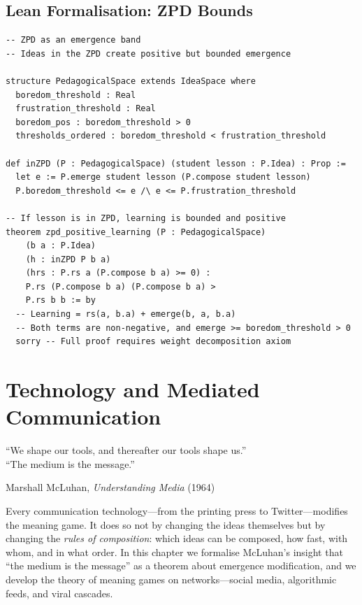 \section{Lean Formalisation: ZPD Bounds}
\label{sec:pedagogy-lean}

\begin{lstlisting}[caption={Zone of proximal development in Lean 4},label={lst:zpd}]
-- ZPD as an emergence band
-- Ideas in the ZPD create positive but bounded emergence

structure PedagogicalSpace extends IdeaSpace where
  boredom_threshold : Real
  frustration_threshold : Real
  boredom_pos : boredom_threshold > 0
  thresholds_ordered : boredom_threshold < frustration_threshold

def inZPD (P : PedagogicalSpace) (student lesson : P.Idea) : Prop :=
  let e := P.emerge student lesson (P.compose student lesson)
  P.boredom_threshold <= e /\ e <= P.frustration_threshold

-- If lesson is in ZPD, learning is bounded and positive
theorem zpd_positive_learning (P : PedagogicalSpace)
    (b a : P.Idea)
    (h : inZPD P b a)
    (hrs : P.rs a (P.compose b a) >= 0) :
    P.rs (P.compose b a) (P.compose b a) >
    P.rs b b := by
  -- Learning = rs(a, b.a) + emerge(b, a, b.a)
  -- Both terms are non-negative, and emerge >= boredom_threshold > 0
  sorry -- Full proof requires weight decomposition axiom
\end{lstlisting}



\chapter{Technology and Mediated Communication}
\label{ch:technology}

\epigraph{``We shape our tools, and thereafter our tools shape us.''\\ \medskip
``The medium is the message.''}{Marshall McLuhan, \textit{Understanding Media} (1964)}

Every communication technology---from the printing press to
Twitter---modifies the meaning game.  It does so not by changing
the ideas themselves but by changing the \emph{rules of composition}:
which ideas can be composed, how fast, with whom, and in what order.
In this chapter we formalise McLuhan's insight that ``the medium is
the message'' as a theorem about emergence modification, and we
develop the theory of meaning games on networks---social media,
algorithmic feeds, and viral cascades.

